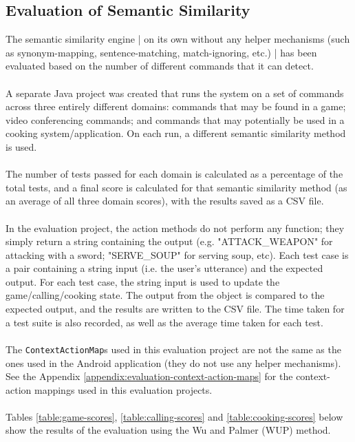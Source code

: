\documentclass[11pt]{article}
\begin{document}
\subsection{Evaluation of Semantic Similarity}
\label{section:eval-similarity}

The semantic similarity engine | on its own without any helper mechanisms (such as synonym-mapping, sentence-matching, match-ignoring, etc.) | has been evaluated based on the number of different commands that it can detect.
\\
\\
A separate Java project was created that runs the system on a set of commands across three entirely different domains: commands that may be found in a game; video conferencing commands; and commands that may potentially be used in a cooking system/application. On each run, a different semantic similarity method is used.
\\
\\
The number of tests passed for each domain is calculated as a percentage of the total tests, and a final score is calculated for that semantic similarity method (as an average of all three domain scores), with the results saved as a CSV file.
\\
\\
In the evaluation project, the action methods do not perform any function; they simply return a string containing the output (e.g. "ATTACK\_WEAPON" for attacking with a  sword; "SERVE\_SOUP" for serving soup, etc). Each test case is a pair containing a string input (i.e. the user's utterance) and the expected output. For each test case, the string input is used to update the game/calling/cooking state. The output from the object is compared to the expected output, and the results are written to the CSV file. The time taken for a test suite is also recorded, as well as the average time taken for each test.
\\
\\
The \texttt{ContextActionMap}s used in this evaluation project are not the same as the ones used in the Android application (they do not use any helper mechanisms). See the Appendix \ref{appendix:evaluation-context-action-maps} for the context-action mappings used in this evaluation projects.
\\
\\
Tables \ref{table:game-scores}, \ref{table:calling-scores} and \ref{table:cooking-scores} below show the results of the evaluation using the Wu and Palmer (WUP) method.
\end{document}
